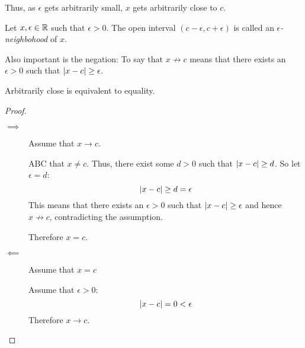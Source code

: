 \documentclass[letterpaper,12pt,fleqn]{article}
\newcommand{\e}{\epsilon}
\begin{document}
Thus, as \(\e\) gets arbitrarily small, \(x\) gets arbitrarily close to \(c\).

\begin{definition}[Neighborhood]
  Let \(x,\e\in\R\) such that \(\e>0\).  The open interval \((c-\e,c+\e)\) is called an \emph{\(\e\)-neighbohood}
  of \(x\).
\end{definition}

Also important is the negation: To say that \(x\not\to c\) means that there exists an \(\e>0\) such that
\(\abs{x-c}\ge\e\).

\bigskip

\begin{center}
\end{center}

\begin{theorem}
  Arbitrarily close is equivalent to equality.
\end{theorem}

\begin{proof}
  \begin{description}
    \item[]
    \item[\(\implies\)] Assume that \(x\to c\).

      ABC that \(x\ne c\).  Thus, there exist some \(d>0\) such that \(\lvert x-c\rvert\ge d\).  So let \(\e=d\):
      \[\abs{x-c}\ge d=\e\]
      This means that there exists an \(\e>0\) such that \(\abs{x-c}\ge\e\) and hence \(x\not\to c\), contradicting
      the assumption.

      Therefore \(x=c\).

    \item[\(\impliedby\)] Assume that \(x=c\)

      Assume that \(\e>0\):
      \[\abs{x-c}=0<\e\]
      Therefore \(x\to c\).
  \end{description}
\end{proof}
\end{document}
